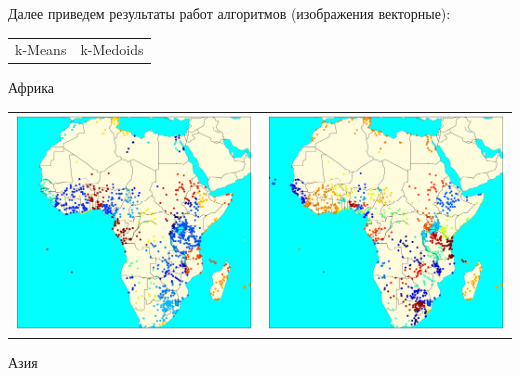 \documentclass[12pt, a4paper]{article}
\begin{document}
			Далее приведем результаты работ алгоритмов (изображения векторные):
			\begin{center}
			\begin{tabular}{l r}
				k-Means & k-Medoids \\
			\end{tabular}

			Африка

			\begin{tabular}{c c}
				\includegraphics[width=8cm]{AF_k_means.pdf} &
				\includegraphics[width=8cm]{AF_k_medoids.pdf} \\
			\end{tabular}

			Азия


\end{center}
\end{document}
